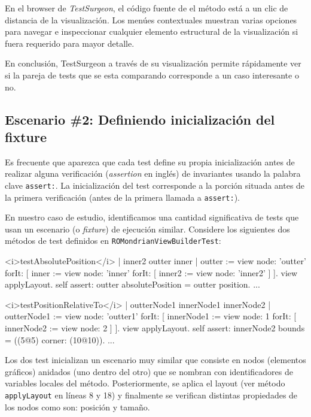 \par En el browser de \emph{TestSurgeon}, el código fuente de el método está a un clic de distancia de la visualización. Los menúes contextuales muestran varias opciones para navegar e inspeccionar cualquier elemento estructural de la visualización si fuera requerido para mayor detalle.


\par En conclusión, TestSurgeon a través de su visualización permite rápidamente ver si la pareja de tests que se esta comparando corresponde a un caso interesante o no.

\subsection{Escenario \#2: Definiendo inicialización del fixture}

\par Es frecuente que aparezca que cada test define su propia inicialización antes de realizar alguna verificación (\emph{assertion} en inglés) de invariantes usando la palabra clave {\tt assert:}. La inicialización del test corresponde a la porción situada antes de la primera verificación (\ie antes de la primera llamada a {\tt assert:}).

\par En nuestro caso de estudio, identificamos una cantidad significativa de tests que usan un escenario (o \emph{fixture}) de ejecución similar. Considere los siguientes dos métodos de test definidos en {\tt ROMondrianViewBuilderTest}:

\begin{codeWithLineNumbers}
<i>testAbsolutePosition</i>
	| inner2 outter inner |
	outter := view node: 'outter' forIt: [
		inner := view node: 'inner' forIt: [
			inner2 := view node: 'inner2'
		]
	].
	view applyLayout.
	self assert: outter absolutePosition = outter position.
	...


<i>testPositionRelativeTo</i>
	| outterNode1 innerNode1 innerNode2 |
	outterNode1 := view node: 'outter1' forIt: 
		[ innerNode1 := view node: 1 forIt: [ 
		innerNode2 := view node: 2 ] ].
	view applyLayout.
	self assert: innerNode2 bounds = ((5@5) corner: (10@10)).
	...
\end{codeWithLineNumbers}

\par Los dos test inicializan un escenario muy similar que consiste en nodos (elementos gráficos) anidados (uno dentro del otro) que se nombran con identificadores de variables locales del método. Posteriormente, se aplica el layout (ver método {\tt applyLayout} en líneas 8 y 18) y finalmente se verifican distintas propiedades de los nodos como son: posición y tamaño.

